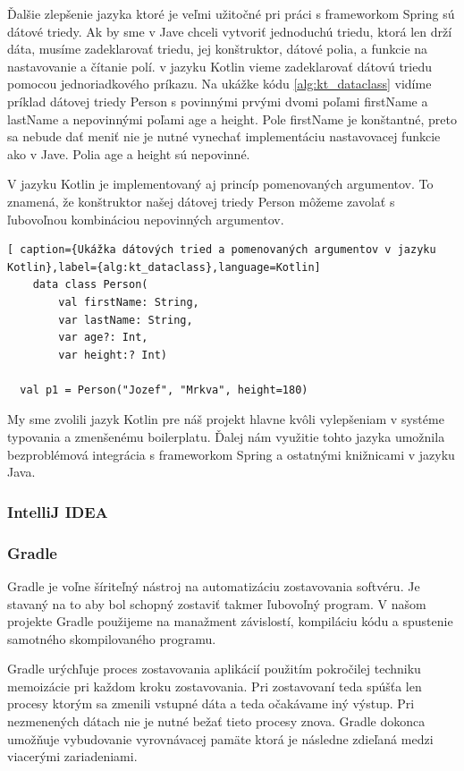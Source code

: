 Ďalšie zlepšenie jazyka ktoré je veľmi užitočné pri práci s frameworkom Spring sú dátové triedy. Ak by sme v Jave chceli vytvoriť jednoduchú triedu, ktorá len drží dáta, musíme zadeklarovať triedu, jej konštruktor, dátové polia, a funkcie na nastavovanie a čítanie polí. v jazyku Kotlin vieme zadeklarovať dátovú triedu pomocou jednoriadkového príkazu. Na ukážke kódu \ref{alg:kt_dataclass} vidíme príklad dátovej triedy Person s povinnými prvými dvomi poľami firstName a lastName a nepovinnými poľami age a height. Pole firstName je konštantné, preto sa nebude dať meniť nie je nutné vynechať implementáciu nastavovacej funkcie ako v Jave. Polia age a height sú nepovinné.  
 
V jazyku Kotlin je implementovaný aj princíp pomenovaných argumentov. To znamená, že konštruktor našej dátovej triedy Person môžeme zavolať s ľubovoľnou kombináciou nepovinných argumentov. 

\begin{lstlisting}[ caption={Ukážka dátových tried a pomenovaných argumentov v jazyku Kotlin},label={alg:kt_dataclass},language=Kotlin]
	data class Person(
		val firstName: String,
		var lastName: String,
		var age?: Int,
		var height:? Int)

  val p1 = Person("Jozef", "Mrkva", height=180)		
	\end{lstlisting}



My sme zvolili jazyk Kotlin pre náš projekt hlavne kvôli vylepšeniam v systéme typovania a zmenšenému boilerplatu. Ďalej nám využitie tohto jazyka umožnila bezproblémová integrácia s frameworkom Spring a ostatnými knižnicami v jazyku Java.	

\subsubsection{IntelliJ IDEA}


\subsubsection{Gradle}
Gradle je voľne šíriteľný nástroj na automatizáciu zostavovania softvéru. Je stavaný na to aby bol schopný zostaviť takmer ľubovoľný program.  V našom projekte Gradle použijeme na manažment závislostí, kompiláciu kódu a spustenie samotného skompilovaného programu. 

Gradle urýchľuje proces zostavovania aplikácií použitím pokročilej techniku memoizácie pri každom kroku zostavovania. Pri zostavovaní teda spúšťa len procesy ktorým sa zmenili vstupné dáta  a teda očakávame iný výstup. Pri nezmenených dátach nie je nutné bežať tieto procesy znova. Gradle dokonca umožňuje vybudovanie vyrovnávacej pamäte ktorá je následne zdieľaná medzi viacerými zariadeniami.

